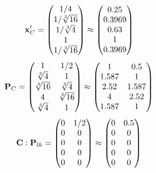\documentclass[10pt,a4paper]{article}
\begin{document}
	\[
		\bold{x}'_{C} = 
		\begin{pmatrix}
			{1} / {{4}} \\
			{1} / {\sqrt[3]{16}} \\
			{1} / {\sqrt[3]{4}} \\
			{1}{} \\
			{1} / {\sqrt[3]{16}} \\
		\end{pmatrix}
		\approx
		\begin{pmatrix}
			0.25     \\
			0.3969   \\
			0.63     \\
			1        \\
			0.3969   \\
		\end{pmatrix}
	\]
	\[
		\bold{P}_{C} = 
		\begin{pmatrix}
			{1}{} & {1} / {{2}} \\
			{\sqrt[3]{4}}{} & {1}{} \\
			{\sqrt[3]{16}}{} & {\sqrt[3]{4}}{} \\
			{{4}}{} & {\sqrt[3]{16}}{} \\
			{\sqrt[3]{4}}{} & {1}{} \\
		\end{pmatrix}
		\approx
		\begin{pmatrix}
			1        & 0.5      \\
			1.587    & 1        \\
			2.52     & 1.587    \\
			4        & 2.52     \\
			1.587    & 1        \\
		\end{pmatrix}
	\]
	\[
		\bold{C}: \bold{P}_{lk} = 
		\begin{pmatrix}
			{{0}}{} & {1} / {{2}} \\
			{{0}}{} & {{0}}{} \\
			{{0}}{} & {{0}}{} \\
			{{0}}{} & {{0}}{} \\
			{{0}}{} & {{0}}{} \\
		\end{pmatrix}
		\approx
		\begin{pmatrix}
			0        & 0.5      \\
			0        & 0        \\
			0        & 0        \\
			0        & 0        \\
			0        & 0        \\
		\end{pmatrix}
	\]
\end{document}
